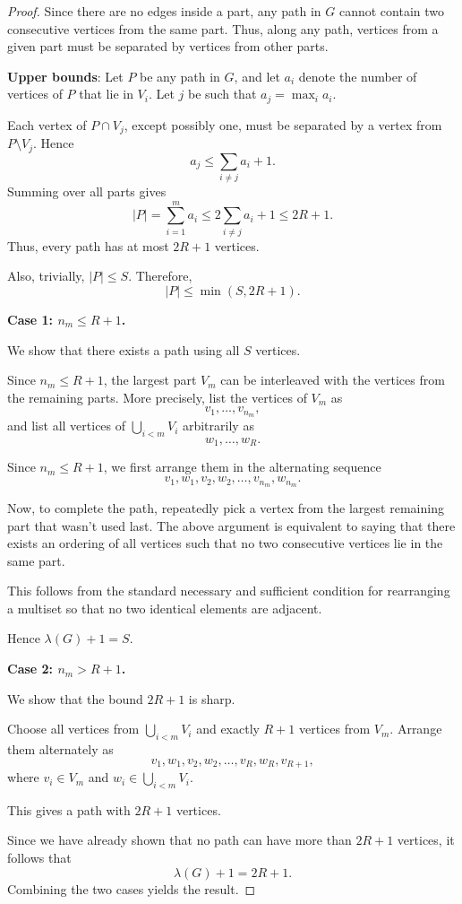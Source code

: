 \documentclass[12pt,reqno]{amsart}
\theoremstyle{definition}
\begin{document}
\begin{proof}
    Since there are no edges inside a part, any path in $G$ cannot contain two consecutive vertices from the same part. Thus, along any path, vertices from a given part must be separated by vertices from other parts.

\medskip

\noindent\textbf{Upper bounds}: Let $P$ be any path in $G$, and let $a_i$ denote the number of vertices of $P$ that lie in $V_i$. Let $j$ be such that $a_j = \max_i a_i$.

Each vertex of $P \cap V_j$, except possibly one, must be separated by a vertex from $P \setminus V_j$. Hence
\[
a_j \le \sum_{i \ne j} a_i + 1.
\]
Summing over all parts gives
\[
|P| = \sum_{i=1}^m a_i \le 2 \sum_{i \ne j} a_i + 1 \le 2R + 1.
\]
Thus, every path has at most $2R+1$ vertices.

Also, trivially, $|P| \le S$. Therefore,
\[
|P| \le \min(S, 2R+1).
\]

\medskip

\noindent\textbf{Case 1: $n_m \le R+1$.}

We show that there exists a path using all $S$ vertices.

Since $n_m \le R+1$, the largest part $V_m$ can be interleaved with the vertices from the remaining parts. More precisely, list the vertices of $V_m$ as
\[
v_1,\dots,v_{n_m},
\]
and list all vertices of $\bigcup_{i<m} V_i$ arbitrarily as
\[
w_1,\dots,w_R.
\]

Since $n_m \le R+1$, we first arrange them in the alternating sequence
\[
v_1, w_1, v_2, w_2, \dots, v_{n_m}, w_{n_m}.
\]

Now, to complete the path, repeatedly pick a vertex from the largest remaining part that wasn't used last. 
The above argument is equivalent to saying that there exists an ordering of all vertices such that no two consecutive vertices lie in the same part.

This follows from the standard necessary and sufficient condition for rearranging a multiset so that no two identical elements are adjacent.

Hence $\lambda(G) + 1 = S$.
\medskip

\noindent\textbf{Case 2: $n_m > R+1$.}

We show that the bound $2R+1$ is sharp.

Choose all vertices from $\bigcup_{i<m} V_i$ and exactly $R+1$ vertices from $V_m$. Arrange them alternately as
\[
v_1, w_1, v_2, w_2, \dots, v_R, w_R, v_{R+1},
\]
where $v_i \in V_m$ and $w_i \in \bigcup_{i<m} V_i$.

This gives a path with $2R+1$ vertices.

Since we have already shown that no path can have more than $2R+1$ vertices, it follows that
\[
\lambda(G) + 1 = 2R+1.
\]
Combining the two cases yields the result.
\end{proof}
\end{document}
